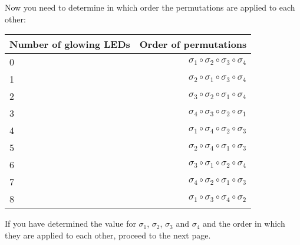 \documentclass[a4paper]{article}
\begin{document}
\noindent
Now you need to determine in which order the permutations are applied to each other:

\begin{table}[h]
\centering{}
\begin{tabular}{l| r}
Number of glowing LEDs & Order of permutations \\
\hline
0 & $\sigma_1\circ\sigma_2\circ\sigma_3\circ\sigma_4$ \\
1 & $\sigma_2\circ\sigma_1\circ\sigma_3\circ\sigma_4$ \\
2 & $\sigma_3\circ\sigma_2\circ\sigma_1\circ\sigma_4$ \\
3 & $\sigma_4\circ\sigma_3\circ\sigma_2\circ\sigma_1$ \\
4 & $\sigma_1\circ\sigma_4\circ\sigma_2\circ\sigma_3$ \\
5 & $\sigma_2\circ\sigma_4\circ\sigma_1\circ\sigma_3$ \\
6 & $\sigma_3\circ\sigma_1\circ\sigma_2\circ\sigma_4$ \\
7 & $\sigma_4\circ\sigma_2\circ\sigma_1\circ\sigma_3$ \\
8 & $\sigma_1\circ\sigma_3\circ\sigma_4\circ\sigma_2$ \\
\end{tabular}
\end{table}
\noindent
If you have determined the value for  $\sigma_1$, $\sigma_2$, $\sigma_3$ and $\sigma_4$ and the order in which they are applied to each other, proceed to the next page.
\newpage
\end{document}
